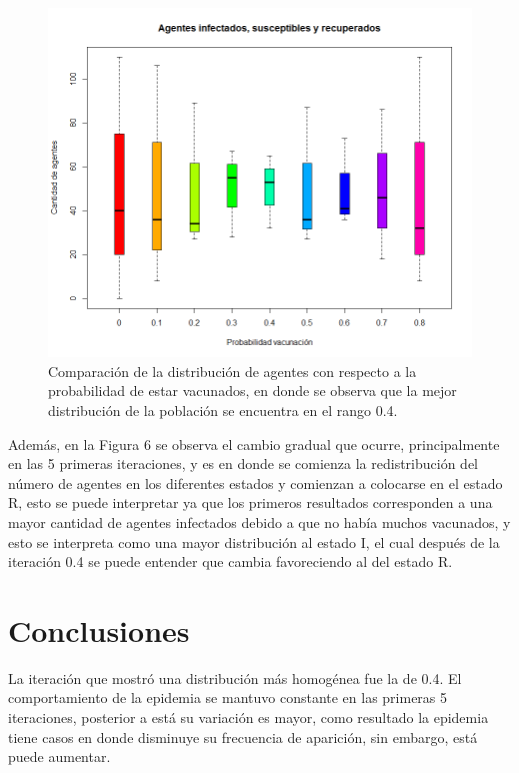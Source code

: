 \documentclass{article}
\begin{document}
\begin{figure}[H]
\centering
\includegraphics[width=13cm]{boxplot.png}
\caption{Comparación de la distribución de agentes con respecto a la probabilidad de estar vacunados, en donde se observa que la mejor distribución de la población se encuentra en el rango 0.4.}
\end{figure}
Además, en la Figura 6 se observa el cambio gradual que ocurre, principalmente en las 5 primeras iteraciones, y es en donde se comienza la redistribución del número de agentes en los diferentes estados y comienzan a colocarse en el estado R, esto se puede interpretar ya que los primeros resultados corresponden a una mayor cantidad de agentes infectados debido a que no había muchos vacunados, y esto se interpreta como una mayor distribución al estado I, el cual después de la iteración 0.4 se puede entender que cambia favoreciendo al del estado R. 

\section{Conclusiones}
La iteración que mostró una distribución más homogénea fue la de 0.4.
El comportamiento de la epidemia se mantuvo constante en las primeras 5 iteraciones, posterior a está su variación es mayor, como resultado la epidemia tiene casos en donde disminuye su frecuencia de aparición, sin embargo, está puede aumentar.




\end{document}
